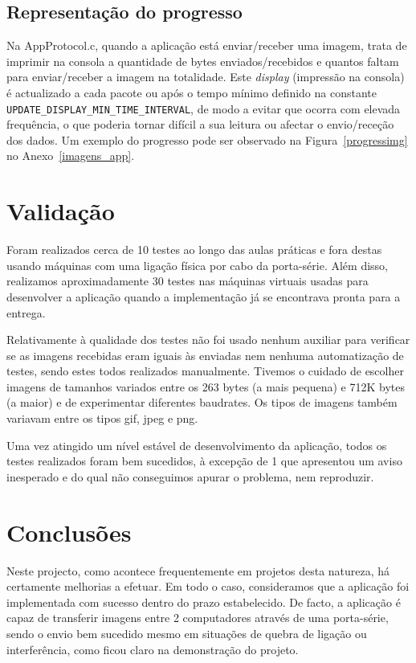 \documentclass[11pt,a4paper,reqno]{report}
\numberwithin{equation}{section}
\begin{document}
\section{Representação do progresso}
Na AppProtocol.c, quando a aplicação está enviar/receber uma imagem, trata de imprimir na consola a quantidade de bytes enviados/recebidos e quantos faltam para enviar/receber a imagem na totalidade. Este \emph{display} (impressão na consola) é actualizado a cada pacote ou após o tempo mínimo definido na constante \verb|UPDATE_DISPLAY_MIN_TIME_INTERVAL|, de modo a evitar que ocorra com elevada frequência, o que poderia tornar difícil a sua leitura ou afectar o envio/receção dos dados. Um exemplo do progresso pode ser observado na Figura~\ref{progressimg} no Anexo~\ref{imagens_app}.

\chapter{Validação}

Foram realizados cerca de 10 testes ao longo das aulas práticas e fora destas usando máquinas com uma ligação física por cabo da porta-série. Além disso, realizamos aproximadamente 30 testes nas máquinas virtuais usadas para desenvolver a aplicação quando a implementação já se encontrava pronta para a entrega.

Relativamente à qualidade dos testes não foi usado nenhum auxiliar para verificar se as imagens recebidas eram iguais às enviadas nem nenhuma automatização de testes, sendo estes todos realizados manualmente. Tivemos o cuidado de escolher imagens de tamanhos variados entre os 263 bytes (a mais pequena) e 712K bytes (a maior) e de experimentar diferentes baudrates. Os tipos de imagens também variavam entre os tipos gif, jpeg e png.

Uma vez atingido um nível estável de desenvolvimento da aplicação, todos os testes realizados foram bem sucedidos, à excepção de 1 que apresentou um aviso inesperado e do qual não conseguimos apurar o problema, nem reproduzir.

\chapter{Conclusões}

Neste projecto, como acontece frequentemente em projetos desta natureza, há certamente melhorias a efetuar. Em todo o caso, consideramos que a aplicação foi implementada com sucesso dentro do prazo estabelecido. De facto, a aplicação é capaz de transferir imagens entre 2 computadores através de uma porta-série, sendo o envio bem sucedido mesmo em situações de quebra de ligação ou interferência, como ficou claro na demonstração do projeto.
\end{document}
